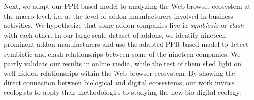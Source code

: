 \documentclass[ijoc,nonblindrev]{informs3} %
\numberwithin{equation}{subsection}
\begin{document}
{Next, we adapt our PPR-based model to
analyzing the Web browser ecosystem at the macro-level, i.e. at the level of addon manufacturers involved
in business activities. We hypothesize that some addon companies live in \emph{symbiosis} or \emph{clash} with each
other. In our large-scale dataset of addons, we identify nineteen prominent addon manufacturers and use the adapted PPR-based model to detect symbiotic and clash relationships between some of
the nineteen companies. We partly validate our results in online media, while the rest of them shed
light on well hidden relationships within the Web browser ecosystem. By showing the direct connection between biological and digital ecosystems, our work invites ecologists to apply their methodologies to studying the new bio-digital ecology.
}%


\HISTORY{}

\maketitle

%
\end{document}
